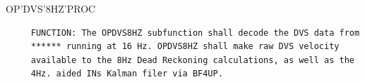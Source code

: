 \begin{frame}
OP'DVS'8HZ'PROC
\begin{verbatim}
     FUNCTION: The OPDVS8HZ subfunction shall decode the DVS data from
     ****** running at 16 Hz. OPDVS8HZ shall make raw DVS velocity
     available to the 8Hz Dead Reckoning calculations, as well as the
     4Hz. aided INs Kalman filer via BF4UP.

\end{verbatim}
\end{frame}
